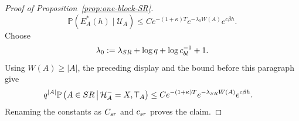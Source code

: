 \documentclass[10pt,a4paper]{amsart}
\begin{document}
\begin{proof}[Proof of Proposition~\ref{prop:one-block-SR}]
\[
        \mathbb P(E_A^*(h)\mid\mathcal U_A)
        \le
        C e^{-(1+\kappa)T}e^{-\lambda_0W(A)}e^{c\beta h}.
\]
Choose
\[
        \lambda_0:=\lambda_{\rm SR}+\log q+\log c_{\rm bl}^{-1}+1.
\]
Using \(W(A)\ge |A|\), the preceding display and the bound before this
paragraph give
\[
\begin{aligned}
    q^{|A|}
    \mathbb P
    \left(
        A\in{\rm SR}
        \,\middle|\,
        \mathcal H_A^-=X,\mathsf T_A
    \right)
    &\le
    C
    e^{-(1+\kappa)T}
    e^{-\lambda_{\rm SR} W(A)}
    e^{c\beta h}.
\end{aligned}
\]
Renaming the constants as \(C_{\rm sr}\) and \(c_{\rm sr}\) proves the claim.





\end{proof}
\end{document}
